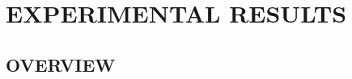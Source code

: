 \documentclass[a4paper,twoside]{article}
\begin{document}






\section{\uppercase{Experimental Results}}\label{sec:uppercase2}

\subsection{\uppercase{Overview}} \label{subsec:uppercase6}
\end{document}
